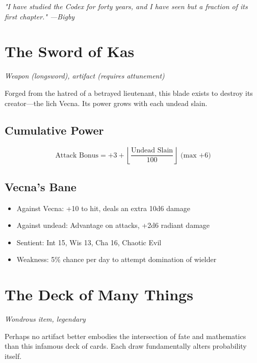\documentclass[11pt,letterpaper,openany]{book}
\newcommand{\fantasyquote}[1]{%
\begin{center}
\textit{\large #1}
\end{center}
}
\begin{document}
\fantasyquote{"I have studied the Codex for forty years, and I have seen but a fraction of its first chapter." —Bigby}

\section{The Sword of Kas}

\textit{Weapon (longsword), artifact (requires attunement)}

Forged from the hatred of a betrayed lieutenant, this blade exists to destroy its creator—the lich Vecna. Its power grows with each undead slain.

\subsection{Cumulative Power}
\begin{equation}
\text{Attack Bonus} = +3 + \left\lfloor\frac{\text{Undead Slain}}{100}\right\rfloor \text{ (max +6)}
\end{equation}

\subsection{Vecna's Bane}
\begin{itemize}
    \item Against Vecna: +10 to hit, deals an extra 10d6 damage
    \item Against undead: Advantage on attacks, +2d6 radiant damage
    \item Sentient: Int 15, Wis 13, Cha 16, Chaotic Evil
    \item Weakness: 5\% chance per day to attempt domination of wielder
\end{itemize}

\section{The Deck of Many Things}

\textit{Wondrous item, legendary}

Perhaps no artifact better embodies the intersection of fate and mathematics than this infamous deck of cards. Each draw fundamentally alters probability itself.
\end{document}
